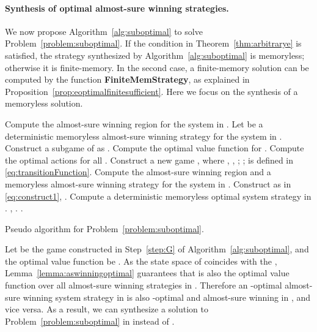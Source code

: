 \documentclass[runningheads,a4paper]{llncs}
\begin{document}
\paragraph{Synthesis of optimal almost-sure winning strategies.} 
We now propose Algorithm~\ref{alg:suboptimal} to solve Problem~\ref{problem:suboptimal}. If the condition in Theorem~\ref{thm:arbitrarye} is satisfied, the strategy synthesized by Algorithm~\ref{alg:suboptimal} is memoryless; otherwise it is finite-memory. In the second case, a finite-memory solution can be computed by the function {\bf FiniteMemStrategy}, as explained in Proposition~\ref{prop:eoptimalfinitesufficient}. Here we focus on the synthesis of a memoryless solution. 


\begin{algorithm}[!t]
\begin{algorithmic}[1]
    \State Compute the almost-sure winning region  for the system in . Let  be a deterministic memoryless almost-sure winning strategy for the system in .
    \State \label{step:G}Construct a subgame of  as . 
    \State Compute the optimal value function  for . 
    \State Compute the optimal actions  for all .
    \State \label{step:hatG}Construct a new game , where , ,  ; ;  is defined in \eqref{eq:transitionFunction}. 
\State \label{step:ashatG}Compute the almost-sure winning region  and a memoryless almost-sure winning strategy  for the system in . 
    \If{} 
\State \label{step:memoryless}Construct  as in \eqref{eq:construct1}, .
    \Else
        \State Compute a deterministic memoryless optimal system strategy  in .
        \State , . 
\EndIf
    \State \Return .
\end{algorithmic}
\caption{Pseudo algorithm for Problem~\ref{problem:suboptimal}.}
\label{alg:suboptimal}
\end{algorithm}

Let  be the game constructed in Step~\ref{step:G} of Algorithm~\ref{alg:suboptimal}, and the optimal value function be . As the state space of  coincides with the , Lemma~\ref{lemma:aswinningoptimal} guarantees that  is also the optimal value function over all almost-sure winning strategies in . Therefore an -optimal almost-sure winning system strategy in  is also -optimal and almost-sure winning in , and vice versa. As a result, we can synthesize a solution to Problem~\ref{problem:suboptimal} in  instead of .
\end{document}
